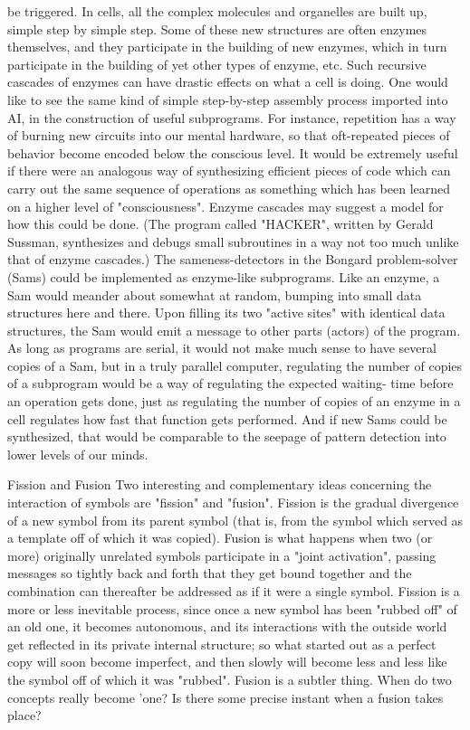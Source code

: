 be triggered. In cells, all the complex molecules and organelles are built up, simple step
by simple step. Some of these new structures are often enzymes themselves, and they
participate in the building of new enzymes, which in turn participate in the building of yet
other types of enzyme, etc. Such recursive cascades of enzymes can have drastic effects
on what a cell is doing. One would like to see the same kind of simple step-by-step
assembly process imported into AI, in the construction of useful subprograms. For
instance, repetition has a way of burning new circuits into our mental hardware, so that
oft-repeated pieces of behavior become encoded below the conscious level. It would be
extremely useful if there were an analogous way of synthesizing efficient pieces of code
which can carry out the same sequence of operations as something which has been
learned on a higher level of "consciousness". Enzyme cascades may suggest a model for
how this could be done. (The program called "HACKER", written by Gerald Sussman,
synthesizes and debugs small subroutines in a way not too much unlike that of enzyme
cascades.)
        The sameness-detectors in the Bongard problem-solver (Sams) could be
implemented as enzyme-like subprograms. Like an enzyme, a Sam would meander about
somewhat at random, bumping into small data structures here and there. Upon filling its
two "active sites" with identical data structures, the Sam would emit a message to other
parts (actors) of the program. As long as programs are serial, it would not make much
sense to have several copies of a Sam, but in a truly parallel computer, regulating the
number of copies of a subprogram would be a way of regulating the expected waiting-
time before an operation gets done, just as regulating the number of copies of an enzyme
in a cell regulates how fast that function gets performed. And if new Sams could be
synthesized, that would be comparable to the seepage of pattern detection into lower
levels of our minds.

                                    Fission and Fusion
Two interesting and complementary ideas concerning the interaction of symbols are
"fission" and "fusion". Fission is the gradual divergence of a new symbol from its parent
symbol (that is, from the symbol which served as a template off of which it was copied).
Fusion is what happens when two (or more) originally unrelated symbols participate in a
"joint activation", passing messages so tightly back and forth that they get bound together
and the combination can thereafter be addressed as if it were a single symbol. Fission is a
more or less inevitable process, since once a new symbol has been "rubbed off" of an old
one, it becomes autonomous, and its interactions with the outside world get reflected in
its private internal structure; so what started out as a perfect copy will soon become
imperfect, and then slowly will become less and less like the symbol off of which it was
"rubbed". Fusion is a subtler thing. When do two concepts really become 'one? Is there
some precise instant when a fusion takes place?




